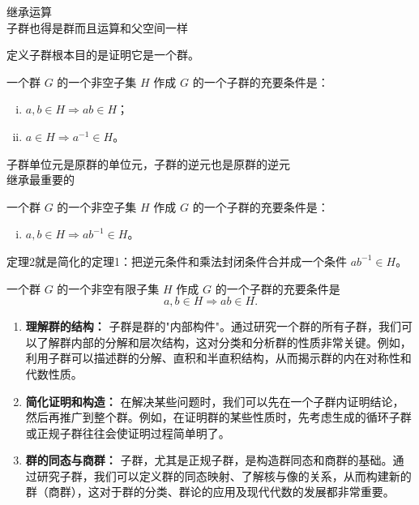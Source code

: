 \begin{note}[子群]
继承运算 \\
子群也得是群而且运算和父空间一样
\end{note}

\begin{note}[定义子群的目的（定义 1.13）]
定义子群根本目的是证明它是一个群。
\end{note}

\begin{theorem}[定理 1：子群充要条件]
一个群 $G$ 的一个非空子集 $H$ 作成 $G$ 的一个子群的充要条件是：
\begin{enumerate}[(i)]
  \item $a,b\in H\Rightarrow ab\in H$；
  \item $a\in H\Rightarrow a^{-1}\in H$。
\end{enumerate}
\end{theorem}

\begin{note}[定理1子群充要条件]
子群单位元是原群的单位元，子群的逆元也是原群的逆元 \\
继承最重要的
\end{note}

\begin{theorem}[定理 2：子群充要条件]
一个群 $G$ 的一个非空子集 $H$ 作成 $G$ 的一个子群的充要条件是：
\begin{enumerate}[(iii)]
  \item $a,b\in H\Rightarrow ab^{-1}\in H$。
\end{enumerate}
\end{theorem}

\begin{note}[定理2非空子集充要条件]
定理2就是简化的定理1：把逆元条件和乘法封闭条件合并成一个条件 $ab^{-1}\in H$。
\end{note}

\begin{theorem}[定理 3：非空有限子群]
一个群 $G$ 的一个非空有限子集 $H$ 作成 $G$ 的一个子群的充要条件是
\[
a,b\in H\Rightarrow ab\in H.
\]
\end{theorem}

\begin{note}[学子群的意义]
\begin{enumerate}
  \item \textbf{理解群的结构：} 子群是群的"内部构件"。通过研究一个群的所有子群，我们可以了解群内部的分解和层次结构，这对分类和分析群的性质非常关键。例如，利用子群可以描述群的分解、直积和半直积结构，从而揭示群的内在对称性和代数性质。
  \item \textbf{简化证明和构造：} 在解决某些问题时，我们可以先在一个子群内证明结论，然后再推广到整个群。例如，在证明群的某些性质时，先考虑生成的循环子群或正规子群往往会使证明过程简单明了。
  \item \textbf{群的同态与商群：} 子群，尤其是正规子群，是构造群同态和商群的基础。通过研究子群，我们可以定义群的同态映射、了解核与像的关系，从而构建新的群（商群），这对于群的分类、群论的应用及现代代数的发展都非常重要。
\end{enumerate}
\end{note}

